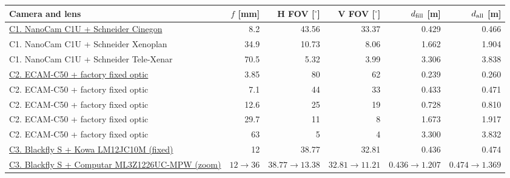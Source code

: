 \documentclass[10pt,a4paper,landscape]{article}
\begin{document}
\begin{center}
\setlength{\tabcolsep}{7pt}
\renewcommand{\arraystretch}{1.15}
\begin{tabular}{@{}>{\RaggedRight\arraybackslash}p{99mm}rrrrr@{}}
\toprule
\textbf{Camera and lens} & \textbf{$f$ [mm]} & \textbf{H FOV [$^\circ$]} & \textbf{V FOV [$^\circ$]} & \textbf{$d_{\rm fill}$ [m]} & \textbf{$d_{\rm all}$ [m]} \\
\midrule
\href{https://gomspace.com/wp-content/uploads/2025/12/gs-ds-nanocam-c1u_DS_-_1010105_-_1_-_18_-_1.pdf}{C1. NanoCam C1U + Schneider Cinegon} & 8.2 & 43.56 & 33.37 & 0.429 & 0.466 \\
C1. NanoCam C1U + Schneider Xenoplan & 34.9 & 10.73 & 8.06 & 1.662 & 1.904 \\
C1. NanoCam C1U + Schneider Tele-Xenar & 70.5 & 5.32 & 3.99 & 3.306 & 3.838 \\
\midrule
\href{https://www.msss.com/files/ECAM-C50_M50.pdf}{C2. ECAM-C50 + factory fixed optic} & 3.85 & 80 & 62 & 0.239 & 0.260 \\
C2. ECAM-C50 + factory fixed optic & 7.1 & 44 & 33 & 0.433 & 0.471 \\
C2. ECAM-C50 + factory fixed optic & 12.6 & 25 & 19 & 0.728 & 0.810 \\
C2. ECAM-C50 + factory fixed optic & 29.7 & 11 & 8 & 1.673 & 1.917 \\
C2. ECAM-C50 + factory fixed optic & 63 & 5 & 4 & 3.300 & 3.832 \\
\midrule
\href{https://www.kowa-lenses.com/LM12JC10M-2-3-12mm-10MP-C-Mount-Lens/10704}{C3. Blackfly S + Kowa LM12JC10M (fixed)} & 12 & 38.77 & 32.81 & 0.436 & 0.474 \\
\href{https://computarganz.s3.amazonaws.com/Computar+Active+Resources/ML3Z1226UC-MPW+Spec.pdf}{C3. Blackfly S + Computar ML3Z1226UC-MPW (zoom)} & $12\to36$ & $38.77\to13.38$ & $32.81\to11.21$ & $0.436\to1.207$ & $0.474\to1.369$ \\
\bottomrule
\end{tabular}
\end{center}
\end{document}
